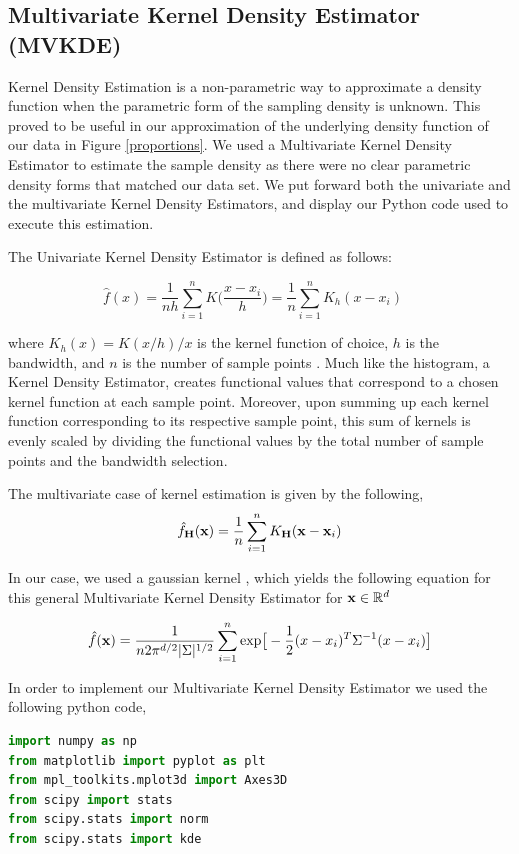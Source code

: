 \documentclass[letterpaper,12pt]{article}
\theoremstyle{definition}
\begin{document}
\begin{spacing}{1.5}
  \subsection{Multivariate Kernel Density Estimator (MVKDE)}\label{SecDistMVKDE}


    Kernel Density Estimation is a non-parametric way to approximate a density function when the parametric form of the sampling density is unknown. This proved to be useful in our approximation of the underlying density function of our data in Figure \ref{proportions}. We used a Multivariate Kernel Density Estimator to estimate the sample density as there were no clear parametric density forms that matched our data set. We put forward both the univariate and the multivariate Kernel Density Estimators, and display our Python code used to execute this estimation.

    The Univariate Kernel Density Estimator is defined as follows:

    \[\hat{f}(x) = \frac{1}{nh} \sum_{i=1}^n K\Big(\frac{x-x_i}{h}\Big)= \frac{1}{n}\sum_{i=1}^n K_h (x - x_i) \quad \]

    where $K_h(x) =  K(x/h)/x$ is the kernel function of choice, $h$ is the bandwidth, and $n$ is the number of sample points \citet{Scott:2015}. Much like the histogram, a Kernel Density Estimator, creates functional values that correspond to a chosen kernel function at each sample point. Moreover, upon summing up each kernel function corresponding to its respective sample point, this sum of kernels is evenly scaled by dividing the functional values by the total number of sample points and the bandwidth selection.

    The multivariate case of kernel estimation is given by the following,
    \[\hat{f}_\bold{H}(\bold{x})= \frac1n \sum_{i=1}^n K_\bold{H} (\bold{x} - \bold{x}_i)\]

    In our case, we used a gaussian kernel , which yields the following equation for this general Multivariate Kernel Density Estimator for $\bold{x} \in \mathbb{R}^d$

    \[\hat{f}(\bold{x}) = \frac{1}{n2\pi ^{d/2} |\Sigma|^{1/2}} \sum_{i=1}^n \text{exp}\big[-\frac{1}{2}(x-x_i)^T\Sigma ^{-1}(x-x_i)\big]\]
    \citet{Scott:2005}

    In order to implement our Multivariate Kernel Density Estimator we used the following python code,\\

    \begin{lstlisting}[language=Python, caption=MVKDE.py]
import numpy as np
from matplotlib import pyplot as plt
from mpl_toolkits.mplot3d import Axes3D
from scipy import stats
from scipy.stats import norm
from scipy.stats import kde


\end{lstlisting}
\end{spacing}
\end{document}
